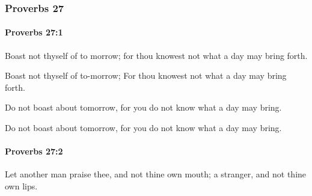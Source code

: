 	\subsubsection{Proverbs 27} %
		\label{PROVERBS-27}

		\paragraph{Proverbs 27:1} %
			\label{PROVERBS-27-1}

			Boast not thyself of to morrow; for thou knowest not what a day may bring forth.

			\begin{versebox}
					\item[BHS] 
					\item[ASV] Boast not thyself of to-morrow; For thou knowest not what a day may bring forth.
					\item[NIV] Do not boast about tomorrow, for you do not know what a day may bring.
					\item[NRSV] Do not boast about tomorrow, for you do not know what a day may bring.
			\end{versebox}

		\paragraph{Proverbs 27:2} %
			\label{PROVERBS-27-2}

			Let another man praise thee, and not thine own mouth; a stranger, and not thine own lips.

